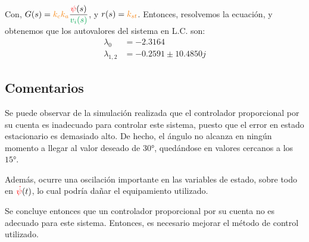 Con, $G(s) =  \nara{k_{c} k_{a}} \dfrac{\rojo{\psi}(s)}{\verd{v_{i}(s)}}$, y
$r(s) = \nara{k_{st}}$. Entonces, resolvemos la ecuación, y obtenemos que los
autovalores del sistema en L.C. son:
\begin{align*}
  \lambda_{0} &= -2.3164 \\
  \lambda_{1,2} &= -0.2591 \pm 10.4850j
\end{align*}

\subsection{Comentarios}

Se puede observar de la simulación realizada que el controlador proporcional por
su cuenta es inadecuado para controlar este sistema, puesto que el error en estado
estacionario es demasiado alto. De hecho, el ángulo no alcanza en ningún momento
a llegar al valor deseado de $\ang{30}$, quedándose en valores cercanos a los $\ang{15}$.

Además, ocurre una oscilación importante en las variables de estado, sobre todo
en $\mathbin{\color{red}\dot\psi}(t)$, lo cual podría dañar el equipamiento utilizado.

Se concluye entonces que un controlador proporcional por su cuenta no es adecuado
para este sistema. Entonces, es necesario mejorar el método de control utilizado.
